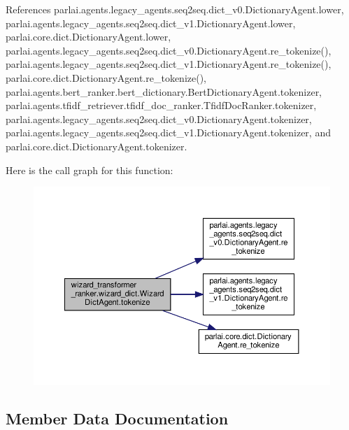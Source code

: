 References parlai.\+agents.\+legacy\+\_\+agents.\+seq2seq.\+dict\+\_\+v0.\+Dictionary\+Agent.\+lower, parlai.\+agents.\+legacy\+\_\+agents.\+seq2seq.\+dict\+\_\+v1.\+Dictionary\+Agent.\+lower, parlai.\+core.\+dict.\+Dictionary\+Agent.\+lower, parlai.\+agents.\+legacy\+\_\+agents.\+seq2seq.\+dict\+\_\+v0.\+Dictionary\+Agent.\+re\+\_\+tokenize(), parlai.\+agents.\+legacy\+\_\+agents.\+seq2seq.\+dict\+\_\+v1.\+Dictionary\+Agent.\+re\+\_\+tokenize(), parlai.\+core.\+dict.\+Dictionary\+Agent.\+re\+\_\+tokenize(), parlai.\+agents.\+bert\+\_\+ranker.\+bert\+\_\+dictionary.\+Bert\+Dictionary\+Agent.\+tokenizer, parlai.\+agents.\+tfidf\+\_\+retriever.\+tfidf\+\_\+doc\+\_\+ranker.\+Tfidf\+Doc\+Ranker.\+tokenizer, parlai.\+agents.\+legacy\+\_\+agents.\+seq2seq.\+dict\+\_\+v0.\+Dictionary\+Agent.\+tokenizer, parlai.\+agents.\+legacy\+\_\+agents.\+seq2seq.\+dict\+\_\+v1.\+Dictionary\+Agent.\+tokenizer, and parlai.\+core.\+dict.\+Dictionary\+Agent.\+tokenizer.

Here is the call graph for this function\+:
\nopagebreak
\begin{figure}[H]
\begin{center}
\leavevmode
\includegraphics[width=350pt]{classwizard__transformer__ranker_1_1wizard__dict_1_1WizardDictAgent_a90fd8189d6fd3007d7ebd6ffac5104ed_cgraph}
\end{center}
\end{figure}


\subsection{Member Data Documentation}
\mbox{\label{classwizard__transformer__ranker_1_1wizard__dict_1_1WizardDictAgent_a6b567b120fddd84336bbdb4804841549}} 
